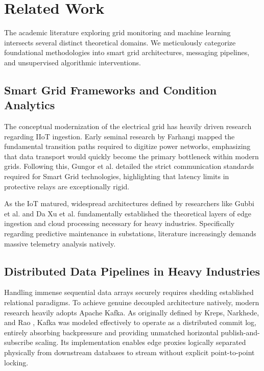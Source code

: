 \documentclass[12pt, a4paper]{article}
\begin{document}
\section{Related Work}

The academic literature exploring grid monitoring and machine learning intersects several distinct theoretical domains. We meticulously categorize foundational methodologies into smart grid architectures, messaging pipelines, and unsupervised algorithmic interventions.

\subsection{Smart Grid Frameworks and Condition Analytics}
The conceptual modernization of the electrical grid has heavily driven research regarding IIoT ingestion. Early seminal research by Farhangi \cite{Farhangi2010} mapped the fundamental transition paths required to digitize power networks, emphasizing that data transport would quickly become the primary bottleneck within modern grids. Following this, Gungor et al. \cite{Gungor2011} detailed the strict communication standards required for Smart Grid technologies, highlighting that latency limits in protective relays are exceptionally rigid. 

As the IoT matured, widespread architectures defined by researchers like Gubbi et al. \cite{Gubbi2013} and Da Xu et al. \cite{DaXu2014} fundamentally established the theoretical layers of edge ingestion and cloud processing necessary for heavy industries. Specifically regarding predictive maintenance in substations, literature increasingly demands massive telemetry analysis natively.

\subsection{Distributed Data Pipelines in Heavy Industries}
Handling immense sequential data arrays securely requires shedding established relational paradigms. To achieve genuine decoupled architecture natively, modern research heavily adopts Apache Kafka. As originally defined by Kreps, Narkhede, and Rao \cite{Kreps2011}, Kafka was modeled effectively to operate as a distributed commit log, entirely absorbing backpressure and providing unmatched horizontal publish-and-subscribe scaling. Its implementation enables edge proxies logically separated physically from downstream databases to stream without explicit point-to-point locking.
\end{document}
